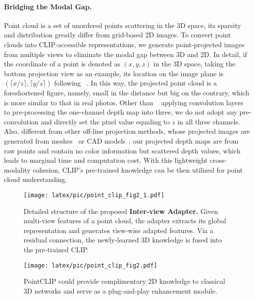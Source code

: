 \documentclass[10pt,twocolumn,letterpaper]{article}
\begin{document}
\vspace*{-8pt}
\paragraph{Bridging the Modal Gap.}
Point cloud is a set of unordered points scattering in the 3D space, its sparsity and distribution greatly differ from grid-based 2D images. To convert point clouds into CLIP-accessible representations, we generate point-projected images from multiple views to eliminate the modal gap between 3D and 2D. In detail, if the coordinate of a point is denoted as $(x, y, z)$ in the 3D space, taking the bottom projection view as an example, its location on the image plane is $(\lceil x/z\rceil, \lceil y/z\rceil)$ following ~\cite{goyal2021revisiting}. In this way, the projected point cloud is a foreshortened figure, namely, small in the distance but big on the contrary, which is more similar to that in real photos. Other than ~\cite{goyal2021revisiting} applying convolution layers to pre-processing the one-channel depth map into three, we do not adopt any pre-convolution and directly set the pixel value equaling to $z$ in all three channels. Also, different from other off-line projection methods, whose projected images are generated from meshes~\cite{wang20183d} or CAD models~\cite{su2015multi}, our projected depth maps are from raw points and contain no color information but scattered depth values, which leads to marginal time and computation cost. With this lightweight cross-modality cohesion, CLIP's pre-trained knowledge can be then utilized for point cloud understanding.

\begin{figure*}[ht!]
\begin{minipage}[t]{0.63\textwidth}
\texttt{[image: latex/pic/point\_clip\_fig2\_1.pdf]}
\caption{Detailed structure of the proposed \textbf{Inter-view Adapter.} Given multi-view features of a point cloud, the adapter extracts its global representation and generates view-wise adapted features. Via a residual connection, the newly-learned 3D knowledge is fused into the pre-trained CLIP.}
\end{minipage}
\hspace{0.03in}
\begin{minipage}[t]{0.35\textwidth}

\texttt{[image: latex/pic/point\_clip\_fig2.pdf]}
\caption{PointCLIP could provide complimentary 2D knowledge to classical 3D networks and serve as a plug-and-play enhancement module.}
\end{minipage}
\vspace*{-15pt}
\end{figure*}
\end{document}
